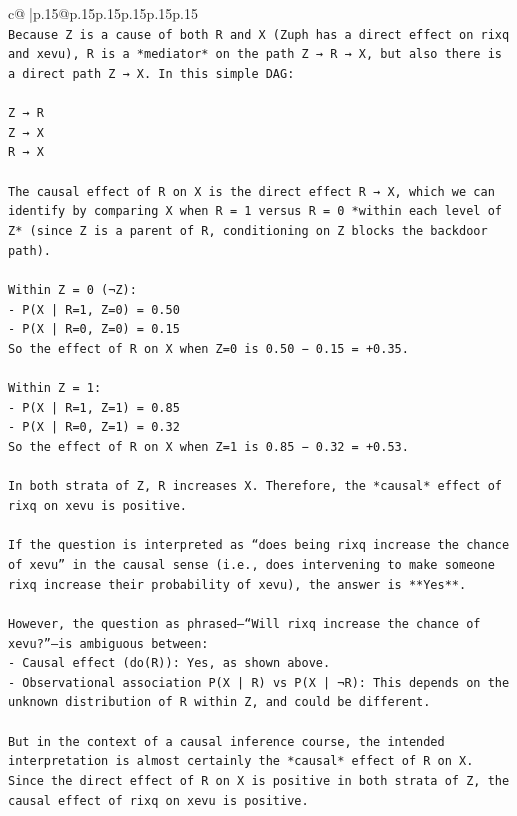 \documentclass{article}
\begin{document}
{\begin{supertabular}{c@{$\;$}|p{.15\linewidth}@{}p{.15\linewidth}p{.15\linewidth}p{.15\linewidth}p{.15\linewidth}p{.15\linewidth}}
{{{\\ 
\texttt{Because Z is a cause of both R and X (Zuph has a direct effect on rixq and xevu), R is a *mediator* on the path Z → R → X, but also there is a direct path Z → X. In this simple DAG:} \\
\\ 
\texttt{Z → R  } \\
\texttt{Z → X  } \\
\texttt{R → X} \\
\\ 
\texttt{The causal effect of R on X is the direct effect R → X, which we can identify by comparing X when R = 1 versus R = 0 *within each level of Z* (since Z is a parent of R, conditioning on Z blocks the backdoor path).} \\
\\ 
\texttt{Within Z = 0 (¬Z):  } \\
\texttt{{-} P(X | R=1, Z=0) = 0.50  } \\
\texttt{{-} P(X | R=0, Z=0) = 0.15  } \\
\texttt{So the effect of R on X when Z=0 is 0.50 − 0.15 = +0.35.} \\
\\ 
\texttt{Within Z = 1:  } \\
\texttt{{-} P(X | R=1, Z=1) = 0.85  } \\
\texttt{{-} P(X | R=0, Z=1) = 0.32  } \\
\texttt{So the effect of R on X when Z=1 is 0.85 − 0.32 = +0.53.} \\
\\ 
\texttt{In both strata of Z, R increases X. Therefore, the *causal* effect of rixq on xevu is positive.} \\
\\ 
\texttt{If the question is interpreted as “does being rixq increase the chance of xevu” in the causal sense (i.e., does intervening to make someone rixq increase their probability of xevu), the answer is **Yes**.} \\
\\ 
\texttt{However, the question as phrased—“Will rixq increase the chance of xevu?”—is ambiguous between:} \\
\texttt{{-} Causal effect (do(R)): Yes, as shown above.} \\
\texttt{{-} Observational association P(X | R) vs P(X | ¬R): This depends on the unknown distribution of R within Z, and could be different.} \\
\\ 
\texttt{But in the context of a causal inference course, the intended interpretation is almost certainly the *causal* effect of R on X. Since the direct effect of R on X is positive in both strata of Z, the causal effect of rixq on xevu is positive.} \\
}}}
\end{supertabular}}
\end{document}
